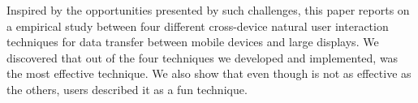 Inspired by the opportunities presented by such challenges, this paper reports on a empirical study between four different cross-device natural user interaction techniques for data transfer between mobile devices and large displays.
We discovered that out of the four techniques we developed and implemented, \swipe was the most effective technique. We also show that even though \pinch is not as effective as the others, users described it as a fun technique.
